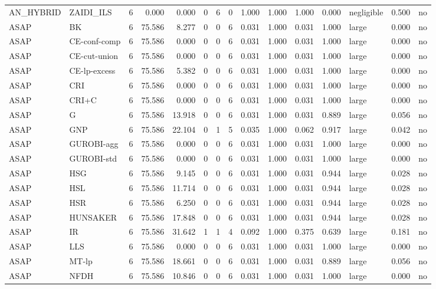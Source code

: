 \begin{table}[htbp]
\begin{tabular}{llrrrrrrrrrrlrr}
AN\_HYBRID & ZAIDI\_ILS & 6 & 0.000 & 0.000 & 0 & 6 & 0 & 1.000 & 1.000 & 1.000 & 0.000 & negligible & 0.500 & no \\
ASAP & BK & 6 & 75.586 & 8.277 & 0 & 0 & 6 & 0.031 & 1.000 & 0.031 & 1.000 & large & 0.000 & no \\
ASAP & CE-conf-comp & 6 & 75.586 & 0.000 & 0 & 0 & 6 & 0.031 & 1.000 & 0.031 & 1.000 & large & 0.000 & no \\
ASAP & CE-cut-union & 6 & 75.586 & 0.000 & 0 & 0 & 6 & 0.031 & 1.000 & 0.031 & 1.000 & large & 0.000 & no \\
ASAP & CE-lp-excess & 6 & 75.586 & 5.382 & 0 & 0 & 6 & 0.031 & 1.000 & 0.031 & 1.000 & large & 0.000 & no \\
ASAP & CRI & 6 & 75.586 & 0.000 & 0 & 0 & 6 & 0.031 & 1.000 & 0.031 & 1.000 & large & 0.000 & no \\
ASAP & CRI+C & 6 & 75.586 & 0.000 & 0 & 0 & 6 & 0.031 & 1.000 & 0.031 & 1.000 & large & 0.000 & no \\
ASAP & G & 6 & 75.586 & 13.918 & 0 & 0 & 6 & 0.031 & 1.000 & 0.031 & 0.889 & large & 0.056 & no \\
ASAP & GNP & 6 & 75.586 & 22.104 & 0 & 1 & 5 & 0.035 & 1.000 & 0.062 & 0.917 & large & 0.042 & no \\
ASAP & GUROBI-agg & 6 & 75.586 & 0.000 & 0 & 0 & 6 & 0.031 & 1.000 & 0.031 & 1.000 & large & 0.000 & no \\
ASAP & GUROBI-std & 6 & 75.586 & 0.000 & 0 & 0 & 6 & 0.031 & 1.000 & 0.031 & 1.000 & large & 0.000 & no \\
ASAP & HSG & 6 & 75.586 & 9.145 & 0 & 0 & 6 & 0.031 & 1.000 & 0.031 & 0.944 & large & 0.028 & no \\
ASAP & HSL & 6 & 75.586 & 11.714 & 0 & 0 & 6 & 0.031 & 1.000 & 0.031 & 0.944 & large & 0.028 & no \\
ASAP & HSR & 6 & 75.586 & 6.250 & 0 & 0 & 6 & 0.031 & 1.000 & 0.031 & 0.944 & large & 0.028 & no \\
ASAP & HUNSAKER & 6 & 75.586 & 17.848 & 0 & 0 & 6 & 0.031 & 1.000 & 0.031 & 0.944 & large & 0.028 & no \\
ASAP & IR & 6 & 75.586 & 31.642 & 1 & 1 & 4 & 0.092 & 1.000 & 0.375 & 0.639 & large & 0.181 & no \\
ASAP & LLS & 6 & 75.586 & 0.000 & 0 & 0 & 6 & 0.031 & 1.000 & 0.031 & 1.000 & large & 0.000 & no \\
ASAP & MT-lp & 6 & 75.586 & 18.661 & 0 & 0 & 6 & 0.031 & 1.000 & 0.031 & 0.889 & large & 0.056 & no \\
ASAP & NFDH & 6 & 75.586 & 10.846 & 0 & 0 & 6 & 0.031 & 1.000 & 0.031 & 1.000 & large & 0.000 & no \\

\end{tabular}
\end{table}
